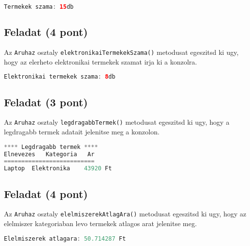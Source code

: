\documentclass{article}
\begin{document}
\begin{lstlisting}[language=Java, caption=Pelda Aruhaz.termekekSzama() kimenet]
Termekek szama: 15db
\end{lstlisting}

\subsection{Feladat (4 pont)}

Az \lstinline{Aruhaz} osztaly \lstinline{elektronikaiTermekekSzama()} metodusat egeszitsd ki ugy, hogy az elerheto elektronikai termekek szamat irja ki a konzolra.

\begin{lstlisting}[language=Java, caption=Pelda Aruhaz.elektronikaiTermekekSzama() kimenet]
Elektronikai termekek szama: 8db
\end{lstlisting}

\subsection{Feladat (3 pont)}

Az \lstinline{Aruhaz} osztaly \lstinline{legdragabbTermek()} metodusat egeszitsd ki ugy, hogy a legdragabb termek adatait jelenitse meg a konzolon.

\begin{lstlisting}[language=Java, caption=Pelda Aruhaz.legdragabbTermek() kimenet]
**** Legdragabb termek ****
Elnevezes   Kategoria   Ar
==========================
Laptop  Elektronika    43920 Ft
\end{lstlisting}

\subsection{Feladat (4 pont)}

Az \lstinline{Aruhaz} osztaly \lstinline{elelmiszerekAtlagAra()} metodusat egeszitsd ki ugy, hogy az elelmiszer kategoriaban levo termekek atlagos arat jelenitse meg.

\begin{lstlisting}[language=Java, caption=Pelda Aruhaz.elelmiszerekAtlagAra() kimenet]
Elelmiszerek atlagara: 50.714287 Ft
\end{lstlisting}
\end{document}
